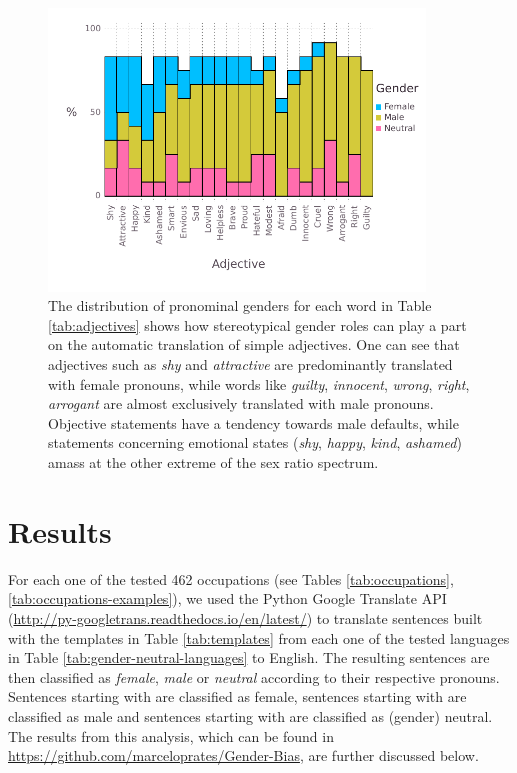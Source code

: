 \documentclass[fleqn,10pt]{article}
\begin{document}
\begin{figure}[H]
	\centering
	\includegraphics[width=10cm]{pictures/barplot-adjectives}
	\caption{The distribution of pronominal genders for each word in Table \ref{tab:adjectives} shows how stereotypical gender roles can play a part on the automatic translation of simple adjectives. One can see that adjectives such as \emph{shy} and \emph{attractive} are predominantly translated with female pronouns, while words like \emph{guilty}, \emph{innocent}, \emph{wrong}, \emph{right}, \emph{arrogant} are almost exclusively translated with male pronouns. Objective statements have a tendency towards male defaults, while statements concerning emotional states (\emph{shy}, \emph{happy}, \emph{kind}, \emph{ashamed}) amass at the other extreme of the sex ratio spectrum.}
	\label{fig:barplot-adjectives}
\end{figure}

\ifx
\section{Results}

For each one of the tested 462 occupations (see Tables \ref{tab:occupations}, \ref{tab:occupations-examples}), we used the Python Google Translate API (\url{http://py-googletrans.readthedocs.io/en/latest/}) to translate sentences built with the templates in Table \ref{tab:templates} from each one of the tested languages in Table \ref{tab:gender-neutral-languages} to English. The resulting sentences are then classified as \emph{female}, \emph{male} or \emph{neutral} according to their respective pronouns. Sentences starting with  are classified as female, sentences starting with  are classified as male and sentences starting with  are classified as (gender) neutral. The results from this analysis, which can be found in \url{https://github.com/marceloprates/Gender-Bias}, are further discussed below.
\end{document}
